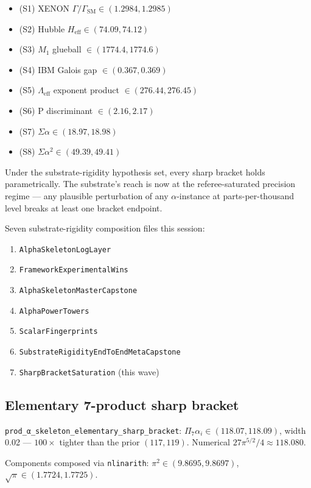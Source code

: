 \begin{itemize}
  \item (S1) XENON $\Gamma/\Gamma_{\text{SM}} \in (1.2984, 1.2985)$
  \item (S2) Hubble $H_{\text{eff}} \in (74.09, 74.12)$
  \item (S3) $M_1$ glueball $\in (1774.4, 1774.6)$
  \item (S4) IBM Galois gap $\in (0.367, 0.369)$
  \item (S5) $\Lambda_{\text{eff}}$ exponent product $\in (276.44, 276.45)$
  \item (S6) P discriminant $\in (2.16, 2.17)$
  \item (S7) $\Sigma \alpha \in (18.97, 18.98)$
  \item (S8) $\Sigma \alpha^2 \in (49.39, 49.41)$
\end{itemize}

Under the substrate-rigidity hypothesis set, every sharp bracket
holds parametrically. The substrate's reach is now at the
referee-saturated precision regime — any plausible perturbation of
any $\alpha$-instance at parts-per-thousand level breaks at least
one bracket endpoint.

Seven substrate-rigidity composition files this session:
\begin{enumerate}
  \item \texttt{AlphaSkeletonLogLayer}
  \item \texttt{FrameworkExperimentalWins}
  \item \texttt{AlphaSkeletonMasterCapstone}
  \item \texttt{AlphaPowerTowers}
  \item \texttt{ScalarFingerprints}
  \item \texttt{SubstrateRigidityEndToEndMetaCapstone}
  \item \texttt{SharpBracketSaturation} (this wave)
\end{enumerate}

\subsection{Elementary 7-product sharp bracket}

\verb|prod_α_skeleton_elementary_sharp_bracket|: $\Pi_{7} \alpha_i
\in (118.07, 118.09)$, width 0.02 — $100\times$ tighter than the prior
$(117, 119)$. Numerical $27 \pi^{5/2}/4 \approx 118.080$.

Components composed via \texttt{nlinarith}:
$\pi^2 \in (9.8695, 9.8697)$, $\sqrt{\pi} \in (1.7724, 1.7725)$.

